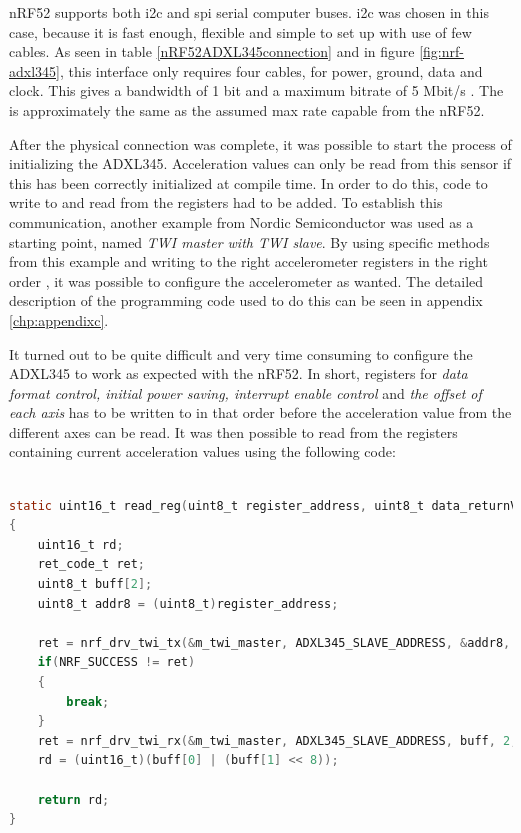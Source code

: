 \newpage

\noindent \gls{nRF52} supports both \gls{i2c} and \gls{spi} serial computer buses. \gls{i2c} was chosen in this case, because it is fast enough, flexible and simple to set up with use of few cables. As seen in table \ref{nRF52ADXL345connection} and in figure \ref{fig:nrf-adxl345}, this interface only requires four cables, for power, ground, data and clock. This gives a bandwidth of 1 bit and a maximum bitrate of 5 Mbit/s \cite{semiconductors2000i2c}. The is approximately the same as the assumed max rate capable from the \gls{nRF52}. 

\noindent After the physical connection was complete, it was possible to start the process of initializing the \gls{ADXL345}. Acceleration values can only be read from this sensor if this has been correctly initialized at compile time. In order to do this, code to write to and read from the registers had to be added. To establish this communication, another example from Nordic Semiconductor was used as a starting point, named \textit{TWI master with TWI slave}. By using specific methods from this example and writing to the right accelerometer registers in the right order \cite{devices2009digital}, it was possible to configure the accelerometer as wanted. The detailed description of the programming code used to do this can be seen in appendix \ref{chp:appendixc}. 

\noindent It turned out to be quite difficult and very time consuming to configure the \gls{ADXL345} to work as expected with the \gls{nRF52}. In short, registers for \textit{data format control, initial power saving, interrupt enable control} and \textit{the offset of each axis} has to be written to in that order before the acceleration value from the different axes can be read. It was then possible to read from the registers containing current acceleration values using the following code: 

\begin{lstlisting}[language=C]

static uint16_t read_reg(uint8_t register_address, uint8_t data_returnValue) 
{
	uint16_t rd;
	ret_code_t ret;
	uint8_t buff[2];
    uint8_t addr8 = (uint8_t)register_address;
    
    ret = nrf_drv_twi_tx(&m_twi_master, ADXL345_SLAVE_ADDRESS, &addr8, 1, true);
    if(NRF_SUCCESS != ret)
    {
        break;
    }
    ret = nrf_drv_twi_rx(&m_twi_master, ADXL345_SLAVE_ADDRESS, buff, 2, false);
	rd = (uint16_t)(buff[0] | (buff[1] << 8));
    
    return rd;	
}

\end{lstlisting}


